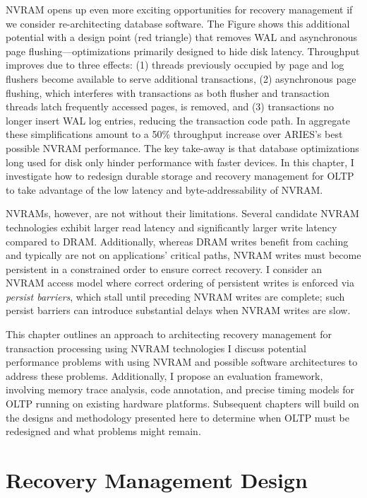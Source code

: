 NVRAM opens up even more exciting opportunities for recovery management if we consider re-architecting database software.
The Figure shows this additional potential with a design point (red triangle) that removes WAL and asynchronous page flushing---optimizations primarily designed to hide disk latency.
Throughput improves due to three effects: (1) threads previously occupied by page and log flushers become available to serve additional transactions, (2) asynchronous page flushing, which interferes with transactions as both flusher and transaction threads latch frequently accessed pages, is removed, and (3) transactions no longer insert WAL log entries, reducing the transaction code path.
In aggregate these simplifications amount to a 50\% throughput increase over ARIES's best possible NVRAM performance.
The key take-away is that database optimizations long used for disk only hinder performance with faster devices.
In this chapter, I investigate how to redesign durable storage and recovery management for OLTP to take advantage of the low latency and byte-addressability of NVRAM.

NVRAMs, however, are not without their limitations.
Se\-veral candidate NVRAM technologies exhibit larger read latency and significantly larger write latency compared to DRAM.
Additionally, whereas DRAM writes benefit from caching and typically are not on applications' critical paths, NVRAM writes must become persistent in a constrained order to ensure correct recovery.
I consider an NVRAM access model where correct ordering of persistent writes is enforced via \emph{persist barriers}, which stall until preceding NVRAM writes are complete; such persist barriers can introduce substantial delays when NVRAM writes are slow.

This chapter outlines an approach to architecting recovery management for transaction processing using NVRAM technologies
I discuss potential performance problems with using NVRAM and possible software architectures to address these problems.
Additionally, I propose an evaluation framework, involving memory trace analysis, code annotation, and precise timing models for OLTP running on existing hardware platforms.
Subsequent chapters will build on the designs and methodology presented here to determine when OLTP must be redesigned and what problems might remain.

\section{Recovery Management Design}
\label{sec:OLTP_design:Design}

